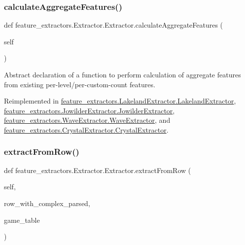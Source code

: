 \subsubsection{\texorpdfstring{calculateAggregateFeatures()}{calculateAggregateFeatures()}}
{\footnotesize\ttfamily def feature\+\_\+extractors.\+Extractor.\+Extractor.\+calculate\+Aggregate\+Features (\begin{DoxyParamCaption}\item[{}]{self }\end{DoxyParamCaption})}



Abstract declaration of a function to perform calculation of aggregate features from existing per-\/level/per-\/custom-\/count features. 



Reimplemented in \mbox{\hyperlink{classfeature__extractors_1_1_lakeland_extractor_1_1_lakeland_extractor_a9f6f9e4a7857cb4905f27e5dad7e1404}{feature\+\_\+extractors.\+Lakeland\+Extractor.\+Lakeland\+Extractor}}, \mbox{\hyperlink{classfeature__extractors_1_1_jowilder_extractor_1_1_jowilder_extractor_aa8634d50ee53ef7244de9a53f45ba9e5}{feature\+\_\+extractors.\+Jowilder\+Extractor.\+Jowilder\+Extractor}}, \mbox{\hyperlink{classfeature__extractors_1_1_wave_extractor_1_1_wave_extractor_a68b4f2df1be2e63fa34ba3813e77efbb}{feature\+\_\+extractors.\+Wave\+Extractor.\+Wave\+Extractor}}, and \mbox{\hyperlink{classfeature__extractors_1_1_crystal_extractor_1_1_crystal_extractor_ac0aa2a8037f8e7575788a8ac88836538}{feature\+\_\+extractors.\+Crystal\+Extractor.\+Crystal\+Extractor}}.

\mbox{\label{classfeature__extractors_1_1_extractor_1_1_extractor_a98fc31f77b3c7650f49480097f1f6da4}} 
\subsubsection{\texorpdfstring{extractFromRow()}{extractFromRow()}}
{\footnotesize\ttfamily def feature\+\_\+extractors.\+Extractor.\+Extractor.\+extract\+From\+Row (\begin{DoxyParamCaption}\item[{}]{self,  }\item[{}]{row\+\_\+with\+\_\+complex\+\_\+parsed,  }\item[{\mbox{\hyperlink{class_game_table_1_1_game_table}{Game\+Table}}}]{game\+\_\+table }\end{DoxyParamCaption})}



